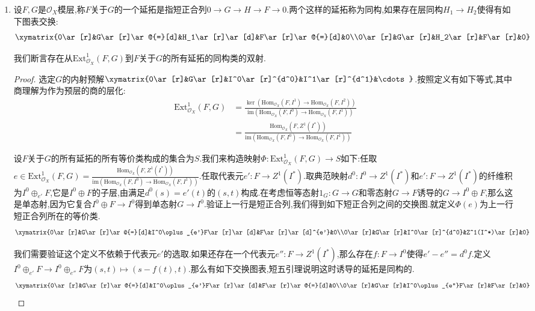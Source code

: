 \begin{enumerate}
\begin{proof}
		这个谱序列塌陷在$s$轴,说明有同构:
		$$H^n(\mathrm{Tot}(M_{s,t}))\cong(^2E)_2^{0,n}=\mathrm{EXT}_X^n(F,G)$$
		
		综上得到自然同构:$$\mathrm{EXT}_X^n(F,G)\cong H^n(\mathrm{HOM}_X(L_*,G))$$
	\end{proof}
	\item 设$F,G$是$\mathscr{O}_X$模层,称$F$关于$G$的一个延拓是指短正合列$0\to G\to H\to F\to0$.两个这样的延拓称为同构,如果存在层同构$H_1\to H_2$使得有如下图表交换:
	$$\xymatrix{0\ar[r]&G\ar[r]\ar@{=}[d]&H_1\ar[r]\ar[d]&F\ar[r]\ar@{=}[d]&0\\0\ar[r]&G\ar[r]&H_2\ar[r]&F\ar[r]&0}$$
	
	我们断言存在从$\mathrm{Ext}_{\mathscr{O}_X}^1(F,G)$到$F$关于$G$的所有延拓的同构类的双射.
	\begin{proof}
		
		选定$G$的内射预解$\xymatrix{0\ar[r]&G\ar[r]&I^0\ar[r]^{d^0}&I^1\ar[r]^{d^1}&\cdots}$.按照定义有如下等式,其中商理解为作为预层的商的层化:
		\begin{align*}
			\mathrm{Ext}_{\mathscr{O}_X}^1(F,G)&=\frac{\ker\left(\mathrm{Hom}_{\mathscr{O}_X}(F,I^1)\to\mathrm{Hom}_{\mathscr{O}_X}(F,I^2)\right)}{\mathrm{im}\left(\mathrm{Hom}_{\mathscr{O}_X}(F,I^0)\to\mathrm{Hom}_{\mathscr{O}_X}(F,I^1)\right)}\\&=\frac{\mathrm{Hom}_{\mathscr{O}_X}(F,Z^1(I^*))}{\mathrm{im}\left(\mathrm{Hom}_{\mathscr{O}_X}(F,I^0)\to\mathrm{Hom}_{\mathscr{O}_X}(F,I^1)\right)}
		\end{align*}
		
		设$F$关于$G$的所有延拓的所有等价类构成的集合为$S$.我们来构造映射$\Phi:\mathrm{Ext}^1_{\mathscr{O}_X}(F,G)\to S$如下:任取$e\in\mathrm{Ext}^1_{\mathscr{O}_X}(F,G)=\frac{\mathrm{Hom}_{\mathscr{O}_X}(F,Z^1(I^*))}{\mathrm{im}\left(\mathrm{Hom}_{\mathscr{O}_X}(F,I^0)\to\mathrm{Hom}_{\mathscr{O}_X}(F,I^1)\right)}$.任取代表元$e':F\to Z^1(I^*)$.取典范映射$d^0:I^0\to Z^1(I^*)$和$e':F\to Z^1(I^*)$的纤维积为$I^0\oplus_{e'}F$,它是$I^0\oplus F$的子层,由满足$d^0(s)=e'(t)$的$(s,t)$构成.在考虑恒等态射$1_G:G\to G$和零态射$G\to F$诱导的$G\to I^0\oplus F$,那么这是单态射,因为它复合$I^0\oplus F\to I^0$得到单态射$G\to I^0$.验证上一行是短正合列,我们得到如下短正合列之间的交换图.就定义$\Phi(e)$为上一行短正合列所在的等价类.
		$$\xymatrix{0\ar[r]&G\ar[r]\ar@{=}[d]&I^0\oplus _{e'}F\ar[r]\ar[d]&F\ar[r]\ar[d]^{e'}&0\\0\ar[r]&G\ar[r]&I^0\ar[r]^{d^0}&Z^1(I^*)\ar[r]&0}$$
		
		我们需要验证这个定义不依赖于代表元$e'$的选取.如果还存在一个代表元$e'':F\to Z^1(I^*)$,那么存在$f:F\to I^0$使得$e'-e''=d^0f$.定义$I^0\oplus_{e'}F\to I^0\oplus_{e''}F$为$(s,t)\mapsto(s-f(t),t)$.那么有如下交换图表,短五引理说明这时诱导的延拓是同构的.
		$$\xymatrix{0\ar[r]&G\ar[r]\ar@{=}[d]&I^0\oplus_{e'}F\ar[r]\ar[d]&F\ar[r]\ar@{=}[d]&0\\0\ar[r]&G\ar[r]&I^0\oplus_{e''}F\ar[r]&F\ar[r]&0}$$
		

\end{proof}
\end{enumerate}
